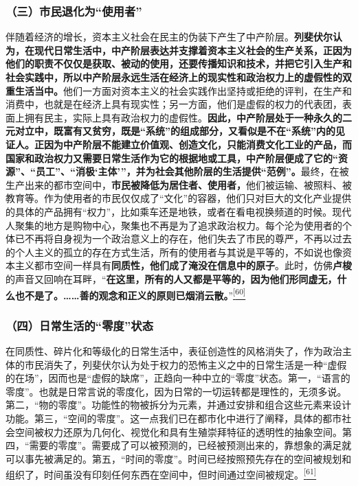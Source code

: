 \documentclass[UTF8, fontset = sourcesans, a4paper, oneside, zihao =
-4, scheme=chinese, no-math, space=true]{ctexbook}
\begin{document}
\subsubsection{\texorpdfstring{（三）市民退化为``使用者''}{（三）市民退化为使用者}}\label{part0007_split_004.htmlux5cux23d021}

伴随着经济的增长，资本主义社会在民主的伪装下产生了中产阶层。\textbf{列斐伏尔认为，在现代日常生活中，中产阶层表达并支撑着资本主义社会的生产关系，正因为他们的职责不仅仅是获取、被动的使用，还要传播知识和技术，并把它引入生产和社会实践中，所以中产阶层永远生活在经济上的现实性和政治权力上的虚假性的双重生活当中。}他们一方面对资本主义的社会实践作出坚持或拒绝的评判，在生产和消费中，也就是在经济上具有现实性；另一方面，他们是虚假的权力的代表团，表面上拥有民主，实际上具有政治权力的虚假性。\textbf{因此，中产阶层处于一种永久的二元对立中，既富有又贫穷，既是``系统''的组成部分，又看似是不在``系统''内的见证人。正因为中产阶层不能建立价值观、创造文化，只能消费文化工业的产品，而国家和政治权力又需要日常生活作为它的根据地或工具，中产阶层便成了它的``资源''、``员工''、``消极`主体'''，并为社会其他阶层的生活提供``范例''。}最终，在被生产出来的都市空间中，\textbf{市民被降低为居住者、使用者，}他们被运输、被照料、被教育等。作为使用者的市民仅仅成了``文化''的容器，他们只对巨大的文化产业提供的具体的产品拥有``权力''，比如乘车还是地铁，或者在看电视换频道的时候。现代人聚集的地方是购物中心，聚集也不再是为了追求政治权力。每个沦为使用者的个体已不再将自身视为一个政治意义上的存在，他们失去了市民的尊严，不再以过去的个人主义的孤立的存在方式生活，所有的使用者与其说是平等的，不如说也像资本主义都市空间一样具有\textbf{同质性，他们成了淹没在信息中的原子}。此时，仿佛\textbf{卢梭}的声音又回响在耳畔，``\textbf{在这里，所有的人又都是平等的，因为他们形同虚无，什么也不是了。……善的观念和正义的原则已烟消云散。}''\protect\hypertarget{part0007_split_004.htmlux5cux23w60}{}{}\protect\hyperlink{part0007_split_004.htmlux5cux23m60}{\textsuperscript{{[}60{]}}}

\subsubsection{\texorpdfstring{（四）日常生活的``零度''状态}{（四）日常生活的零度状态}}\label{part0007_split_004.htmlux5cux23d022}

在同质性、碎片化和等级化的日常生活中，表征创造性的风格消失了，作为政治主体的市民消失了，列斐伏尔认为处于权力的恐怖主义之中的日常生活是一种``虚假的在场''，因而也是``虚假的缺席''，正趋向一种中立的``零度''状态。第一，``语言的零度''。也就是日常言说的零度化，因为日常的一切运转都是理性的，无须多说。第二，``物的零度''。功能性的物被拆分为元素，并通过安排和组合这些元素来设计功能。第三，``空间的零度''。这一点我们已在都市化中进行了阐释，具体的都市社会空间被权力还原为几何化、视觉化和具有生殖崇拜特征的透明性的抽象空间。第四，``需要的零度''。需要成了可以被预测的，已经被预测出来的，靠想象的满足就可以事先被满足的。第五，``时间的零度''。时间已经按照预先存在的空间被规划和组织了，时间虽没有印刻任何东西在空间中，但时间通过空间被规定。\protect\hypertarget{part0007_split_004.htmlux5cux23w61}{}{}\protect\hyperlink{part0007_split_004.htmlux5cux23m61}{\textsuperscript{{[}61{]}}}
\end{document}
